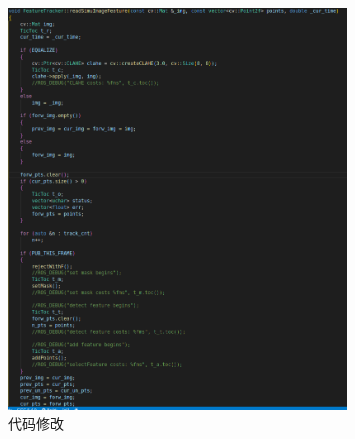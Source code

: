 \documentclass[UTF8]{ctexart}
\begin{document}
\begin{figure}[H]
\centering
\includegraphics[width=0.8\textwidth]{2.png}    
\caption{代码修改}
\label{img0}
\end{figure}
\end{document}
